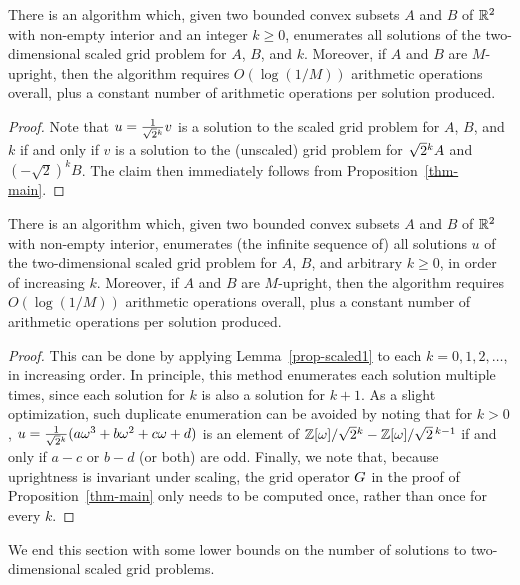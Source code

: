 \documentclass{article}
\begin{document}
\begin{proposition}\label{prop-scaled1}
  There is an algorithm which, given two bounded convex subsets $A$
  and $B$ of ${\mathbb{R}}^2$ with non-empty interior and an integer $k\geq 0$,
  enumerates all solutions of the two-dimensional scaled grid problem
  for $A$, $B$, and $k$. Moreover, if $A$ and $B$ are $M$-upright,
  then the algorithm requires $O(\log(1/M))$ arithmetic operations
  overall, plus a constant number of arithmetic operations per
  solution produced.
\end{proposition}

\begin{proof}
  Note that $u=\frac{1}{\sqrt{2}{}^{k}}v$ is a solution to the scaled grid problem for
  $A$, $B$, and $k$ if and only if $v$ is a solution to the (unscaled)
  grid problem for $\sqrt{2}{}^{k}A$ and $(-\sqrt2)^kB$. The claim then immediately
  follows from Proposition~\ref{thm-main}.
\end{proof}

\begin{proposition}\label{prop-scaled-increasing}
  There is an algorithm which, given two bounded convex subsets $A$
  and $B$ of ${\mathbb{R}}^2$ with non-empty interior, enumerates (the infinite
  sequence of) all solutions $u$ of the two-dimensional scaled grid
  problem for $A$, $B$, and arbitrary $k\geq 0$, in order of
  increasing $k$. Moreover, if $A$ and $B$ are $M$-upright, then the
  algorithm requires $O(\log(1/M))$ arithmetic operations overall,
  plus a constant number of arithmetic operations per solution
  produced.
\end{proposition}

\begin{proof}
  This can be done by applying Lemma~\ref{prop-scaled1} to each
  $k=0,1,2,\ldots$, in increasing order. In principle, this method
  enumerates each solution multiple times, since each solution for $k$
  is also a solution for $k+1$. As a slight optimization, such
  duplicate enumeration can be avoided by noting that for $k>0$,
  $u=\frac{1}{\sqrt{2}{}^{k}}(a\omega^3+b\omega^2+c\omega+d)$ is an element of
  $\mathbb{Z}[\omega]/\sqrt{2}{}^{k} - \mathbb{Z}[\omega]/\sqrt{2}{}^{\,k-1}$ if and only if $a-c$ or
  $b-d$ (or both) are odd.
  Finally, we note that, because uprightness is invariant under
  scaling, the grid operator $G$ in the proof of
  Proposition~\ref{thm-main} only needs to be computed once,
  rather than once for every $k$.
\end{proof}

We end this section with some lower bounds on the number of
solutions to two-dimensional scaled grid problems.
\end{document}
